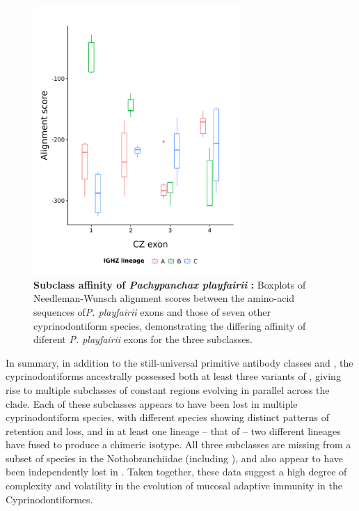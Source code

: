 \begin{figure}
	\centering
	\includegraphics[width=0.7\textwidth]{_Figures/png/ppl-cz-aln-aa.png}
	\caption[Subclass affinity of \textit{Pachypanchax playfairii} ]{\textbf{Subclass affinity of \textit{Pachypanchax playfairii} :} 
	Boxplots of Needleman-Wunsch alignment scores between the amino-acid sequences of\textit{P. playfairii} \cz{} exons and those of seven other cyprinodontiform species, demonstrating the differing affinity of diferent \textit{P. playfairii} exons for the three  subclasses.}
	\label{fig:ppl-cz-aln}
\end{figure}
	
In summary, in addition to the still-universal primitive antibody classes  and , the cyprinodontiforms ancestrally possessed both at least three variants of , giving rise to multiple subclasses of  constant regions evolving in parallel across the clade. Each of these subclasses appears to have been lost in multiple cyprinodontiform species, with different species showing distinct patterns of retention and loss, and in at least one lineage -- that of  -- two different  lineages have fused to produce a chimeric isotype. All three subclasses are missing from a subset of species in the Nothobranchiidae (including \nfu), and also appear to have been independently lost in . Taken together, these data suggest a high degree of complexity and volatility in the evolution of mucosal adaptive immunity in the Cyprinodontiformes.


